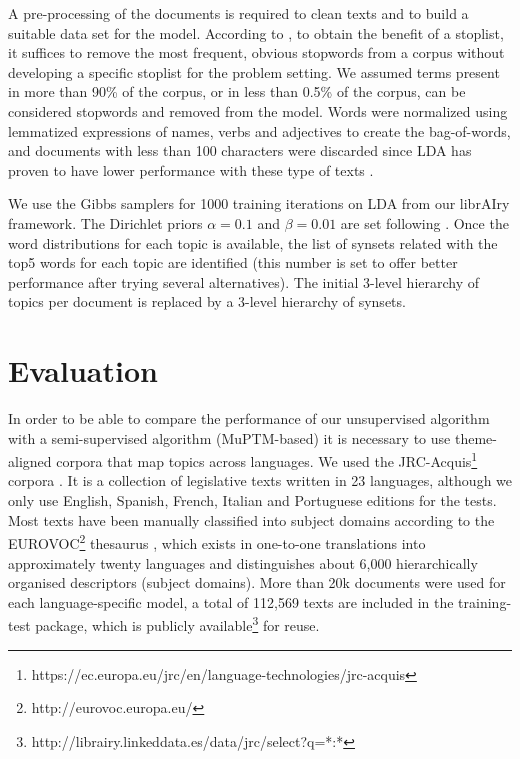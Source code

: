 A pre-processing of the documents is required to clean texts and to build a suitable data set for the model. According to \citep{schofield-etal-2017-pulling}, to obtain the benefit of a stoplist, it suffices to remove the most frequent, obvious stopwords from a corpus without developing a specific stoplist for the problem setting. We assumed terms present in more than 90\% of the corpus, or in less than 0.5\% of the corpus, can be considered stopwords and removed from the model. Words were normalized using lemmatized expressions of names, verbs and adjectives to create the bag-of-words, and documents with less than 100 characters were discarded since LDA has proven to have lower performance with these type of texts \citep{Cheng2014a}. 

We use the Gibbs samplers for 1000 training iterations on LDA from our librAIry framework. The Dirichlet priors $\alpha=0.1$ and $\beta=0.01$ are set following \citep{Hu2014a}. Once the word distributions for each topic is available, the list of synsets related with the top5 words for each topic are identified (this number is set to offer better performance after trying several alternatives). The initial 3-level hierarchy of topics per document is replaced by a 3-level hierarchy of synsets. 

\section{Evaluation}
\label{sec:crosslingual-evaluation}

In order to be able to compare the performance of our unsupervised algorithm with a semi-supervised algorithm (MuPTM-based) it is necessary to use theme-aligned corpora that map topics across languages. We used the JRC-Acquis\footnote{https://ec.europa.eu/jrc/en/language-technologies/jrc-acquis} corpora \citep{Steinberger2006}. It is a collection of legislative texts written in 23 languages, although we only use English, Spanish,  French, Italian and Portuguese editions for the tests. Most texts have been manually classified into subject domains according to the EUROVOC\footnote{http://eurovoc.europa.eu/} thesaurus \citep{Eurovoc1995}, which exists in one-to-one translations into approximately twenty languages and distinguishes about 6,000 hierarchically organised descriptors (subject domains). More than 20k documents were used for each language-specific model, a total of 112,569 texts are included in the training-test package, which is publicly available\footnote{http://librairy.linkeddata.es/data/jrc/select?q=*:*} for reuse.

